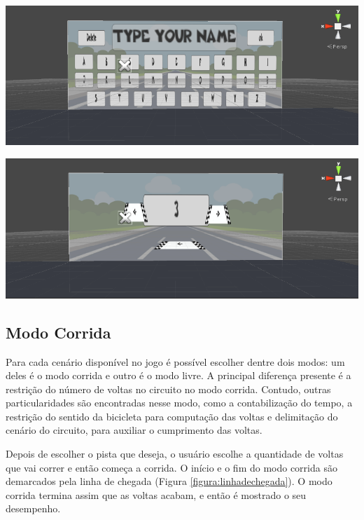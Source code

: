 \begin{center}
	\includegraphics[scale=0.4]{figuras/name}
	\label{figura:name}
\end{center}

\begin{center}
	\includegraphics[scale=0.4]{figuras/numerodevoltas}
	\label{figura:numVoltas}
\end{center}

\subsection{Modo Corrida}
\label{corrida}

Para cada cenário disponível no jogo é possível escolher dentre dois modos: um deles é o modo corrida e outro é o modo livre. A principal diferença presente é a restrição do número de voltas no circuito no modo corrida. Contudo, outras particularidades são encontradas nesse modo, como a contabilização do tempo, a restrição do sentido da bicicleta para computação das voltas e delimitação do cenário do circuito, para auxiliar o cumprimento das voltas.

Depois de escolher o pista que deseja, o usuário escolhe a quantidade de voltas que vai correr e então começa a corrida. O início e o fim do modo corrida são demarcados pela linha de chegada (Figura \ref{figura:linhadechegada}). O modo corrida termina assim que as voltas acabam, e então é mostrado o seu desempenho.

